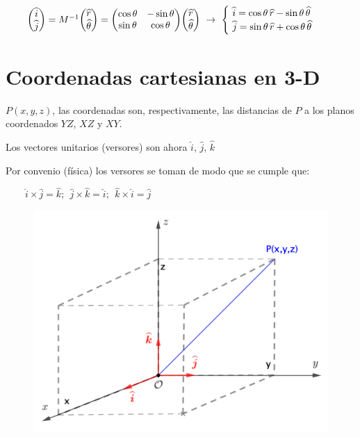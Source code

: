 $\qquad \mqty(\widehat i \\ \widehat j)=M^{-1}\mqty(\widehat r \\ \widehat \theta)= \mqty( \cos \theta & -\sin \theta \\ \sin \theta & \cos \theta)
\mqty(\widehat r \\ \widehat \theta) \ \to \ \begin{cases}
 \ \widehat i= \cos \theta \, \widehat r-\sin \theta \, \widehat \theta \\	
  \ \widehat j= \sin \theta \, \widehat r+\cos \theta \, \widehat \theta
 \end{cases}$
\color{black}

\vspace{1cm}
\section{Coordenadas cartesianas en 3-D}
\vspace{0.5cm}

\begin{multicols}{2}
\normalsize{$P(x,y,z)$, las} coordenadas son, respectivamente, las distancias de $P$ a los planos coordenados $YZ$, $XZ$ y $XY$. 

Los vectores unitarios (versores) son ahora $\widehat i, \, \widehat j,\, \widehat k$

Por convenio (física) los versores se toman de modo que se cumple que:

$\qquad  \widehat i \times \widehat j=\widehat k;\ \ \widehat j \times \widehat k=\widehat i;\ \ \widehat k \times \widehat i=\widehat j$
\begin{figure}[H]
	\centering
	\includegraphics[width=.5\textwidth]{img-coordenadas/coordenadas-04.png}
	\end{figure}	
\end{multicols}

